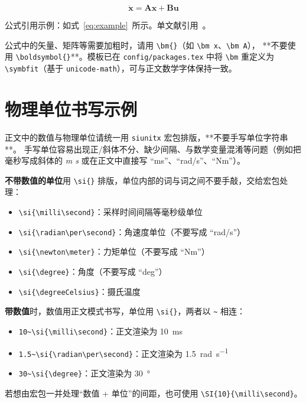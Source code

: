 \begin{equation}
    \dot{\bm x} = \bm A \bm x + \bm B \bm u
    \label{eq:example}
\end{equation}

公式引用示例：如式~\eqref{eq:example}~所示。单文献引用~\cite{sutton2018reinforcement}。

公式中的矢量、矩阵等需要加粗时，请用 \verb|\bm{}|（如 \verb|\bm x|、\verb|\bm A|），
**不要使用 \verb|\boldsymbol{}|**。模板已在 \texttt{config/packages.tex} 中将
\verb|\bm| 重定义为 \verb|\symbfit|（基于 \texttt{unicode-math}），可与正文数学字体保持一致。

\section{物理单位书写示例}

正文中的数值与物理单位请统一用 \texttt{siunitx} 宏包排版，**不要手写单位字符串**。
手写单位容易出现正/斜体不分、缺少间隔、与数学变量混淆等问题（例如把毫秒写成斜体的
\textit{m s} 或在正文中直接写 ``ms''、``rad/s''、``Nm''）。

\textbf{不带数值的单位}用 \verb|\si{}| 排版，单位内部的词与词之间不要手敲，交给宏包处理：

\begin{itemize}
    \item \verb|\si{\milli\second}|：采样时间间隔等毫秒级单位
    \item \verb|\si{\radian\per\second}|：角速度单位（不要写成 ``rad/s''）
    \item \verb|\si{\newton\meter}|：力矩单位（不要写成 ``Nm''）
    \item \verb|\si{\degree}|：角度（不要写成 ``deg''）
    \item \verb|\si{\degreeCelsius}|：摄氏温度
\end{itemize}

\textbf{带数值}时，数值用正文模式书写，单位用 \verb|\si{}|，两者以 \verb|~| 相连：

\begin{itemize}
    \item \verb|10~\si{\milli\second}|：正文渲染为 10~\si{\milli\second}
    \item \verb|1.5~\si{\radian\per\second}|：正文渲染为 1.5~\si{\radian\per\second}
    \item \verb|30~\si{\degree}|：正文渲染为 30~\si{\degree}
\end{itemize}

若想由宏包一并处理“数值 + 单位”的间距，也可使用 \verb|\SI{10}{\milli\second}|。

